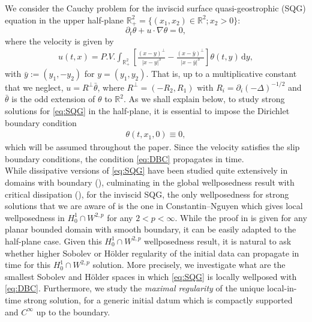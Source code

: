 \documentclass[10pt]{amsart}
\theoremstyle{definition}
\theoremstyle{remark}
\numberwithin{equation}{section}
\newcommand{\lap}{\Delta}
\newcommand{\ud}{\mathrm{d}}
\newcommand{\rd}{\partial}
\newcommand{\nb}{\nabla}
\newcommand{\0}{\emptyset}
\newcommand{\tht}{\theta}
\newcommand{\bbR}{\mathbb R}
\begin{document}
	We consider the Cauchy problem for the inviscid surface quasi-geostrophic (SQG) equation in the upper half-plane $\bbR^2_+ = \{ (x_1,x_2) \in \bbR^2 ; x_{2} > 0 \}$:
	\begin{equation}  \label{eq:SQG} \tag{SQG} \rd_t\tht + u\cdot \nb \tht = 0,   
	\end{equation} where the velocity is given by  \begin{equation}\label{eq:Biot-Savart-SQG} \tag{BS}
		\begin{split}
			u(t,x) = P.V. \int_{ \bbR^2_+ } \left[ \frac{(x-y)^\perp}{|x-y|^{3}} - \frac{(x-\bar{y})^\perp}{|x-\bar{y}|^{3}}   \right] \tht(t,y) \, \ud y,
		\end{split}
	\end{equation} with $\bar{y}:=(y_1,-y_2)$ for $y=(y_1,y_2)$. That is, up to a multiplicative constant that we neglect, $u = R^{\perp}\bar{\tht}$, where $R^{\perp} = (-R_{2}, R_{1})$ with $R_{i} = \rd_{i}(-\lap)^{-1/2}$ and $\bar{\tht}$ is the odd extension of $\tht$ to $\bbR^{2}$. As we shall explain below, to study strong solutions for \eqref{eq:SQG} in the half-plane, it is essential to impose the Dirichlet boundary condition \begin{equation}\label{eq:DBC} \tag{DBC} 
		\begin{split}
			\tht(t, x_1,0) \equiv 0, 
		\end{split}
	\end{equation} which will be assumed throughout the paper. Since the velocity satisfies the slip boundary conditions, the condition \eqref{eq:DBC} propagates in time. \\
	
	While dissipative versions of \eqref{eq:SQG} have been studied quite extensively in domains with boundary (\cite{CI1,CI2,CNgu,CNgu2,StoVa,Ign,Iwa2,Iwa1}), culminating in the  global wellposedness result with critical dissipation (\cite{CIN}), for the inviscid SQG, the only wellposedness for strong solutions that we are aware of is the one in Constantin--Nguyen \cite{CNgu} which gives local wellposedness in $H^{1}_{0} \cap W^{2,p}$ for any $2<p<\infty$. While the proof in \cite{CNgu} is given for any planar bounded domain with smooth boundary, it can be easily adapted to the  half-plane case. %
	 Given this $H^{1}_{0} \cap W^{2,p}$ wellposedness result, it is natural to ask whether higher Sobolev or H\"older regularity of the initial data can propagate in time for this $H^{1}_{0} \cap W^{2,p}$ solution. More precisely, we investigate what are the smallest Sobolev and H\"older spaces in which \eqref{eq:SQG} is locally wellposed with \eqref{eq:DBC}. Furthermore, we study  the \textit{maximal regularity} of the unique local-in-time strong solution, for a generic initial datum which is compactly supported and $C^{\infty}$ up to the boundary. 
	
\end{document}
